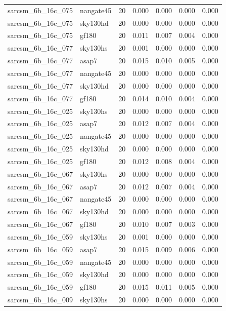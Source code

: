 \begin{tabular}{llrrrrr}
sarcsm\_6b\_16c\_075 & nangate45 & 20 & 0.000 & 0.000 & 0.000 & 0.000 \\
sarcsm\_6b\_16c\_075 & sky130hd & 20 & 0.000 & 0.000 & 0.000 & 0.000 \\
sarcsm\_6b\_16c\_075 & gf180 & 20 & 0.011 & 0.007 & 0.004 & 0.000 \\
sarcsm\_6b\_16c\_077 & sky130hs & 20 & 0.001 & 0.000 & 0.000 & 0.000 \\
sarcsm\_6b\_16c\_077 & asap7 & 20 & 0.015 & 0.010 & 0.005 & 0.000 \\
sarcsm\_6b\_16c\_077 & nangate45 & 20 & 0.000 & 0.000 & 0.000 & 0.000 \\
sarcsm\_6b\_16c\_077 & sky130hd & 20 & 0.000 & 0.000 & 0.000 & 0.000 \\
sarcsm\_6b\_16c\_077 & gf180 & 20 & 0.014 & 0.010 & 0.004 & 0.000 \\
sarcsm\_6b\_16c\_025 & sky130hs & 20 & 0.000 & 0.000 & 0.000 & 0.000 \\
sarcsm\_6b\_16c\_025 & asap7 & 20 & 0.012 & 0.007 & 0.004 & 0.000 \\
sarcsm\_6b\_16c\_025 & nangate45 & 20 & 0.000 & 0.000 & 0.000 & 0.000 \\
sarcsm\_6b\_16c\_025 & sky130hd & 20 & 0.000 & 0.000 & 0.000 & 0.000 \\
sarcsm\_6b\_16c\_025 & gf180 & 20 & 0.012 & 0.008 & 0.004 & 0.000 \\
sarcsm\_6b\_16c\_067 & sky130hs & 20 & 0.000 & 0.000 & 0.000 & 0.000 \\
sarcsm\_6b\_16c\_067 & asap7 & 20 & 0.012 & 0.007 & 0.004 & 0.000 \\
sarcsm\_6b\_16c\_067 & nangate45 & 20 & 0.000 & 0.000 & 0.000 & 0.000 \\
sarcsm\_6b\_16c\_067 & sky130hd & 20 & 0.000 & 0.000 & 0.000 & 0.000 \\
sarcsm\_6b\_16c\_067 & gf180 & 20 & 0.010 & 0.007 & 0.003 & 0.000 \\
sarcsm\_6b\_16c\_059 & sky130hs & 20 & 0.001 & 0.000 & 0.000 & 0.000 \\
sarcsm\_6b\_16c\_059 & asap7 & 20 & 0.015 & 0.009 & 0.006 & 0.000 \\
sarcsm\_6b\_16c\_059 & nangate45 & 20 & 0.000 & 0.000 & 0.000 & 0.000 \\
sarcsm\_6b\_16c\_059 & sky130hd & 20 & 0.000 & 0.000 & 0.000 & 0.000 \\
sarcsm\_6b\_16c\_059 & gf180 & 20 & 0.015 & 0.011 & 0.005 & 0.000 \\
sarcsm\_6b\_16c\_009 & sky130hs & 20 & 0.000 & 0.000 & 0.000 & 0.000 \\

\end{tabular}
